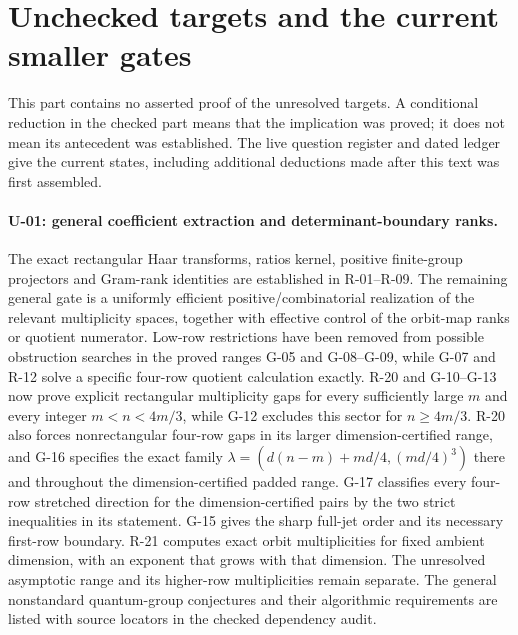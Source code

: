 \section{Unchecked targets and the current smaller gates}

This part contains no asserted proof of the unresolved targets. A conditional reduction in the checked part means that the implication was proved; it does not mean its antecedent was established. The live question register and dated ledger give the current states, including additional deductions made after this text was first assembled.

\paragraph{U-01: general coefficient extraction and determinant-boundary ranks.}
The exact rectangular Haar transforms, ratios kernel, positive finite-group projectors and Gram-rank identities are established in R-01--R-09. The remaining general gate is a uniformly efficient positive/combinatorial realization of the relevant multiplicity spaces, together with effective control of the orbit-map ranks or quotient numerator. Low-row restrictions have been removed from possible obstruction searches in the proved ranges G-05 and G-08--G-09, while G-07 and R-12 solve a specific four-row quotient calculation exactly. R-20 and G-10--G-13 now prove explicit rectangular multiplicity gaps for every sufficiently large $m$ and every integer $m<n<4m/3$, while G-12 excludes this sector for $n\geq4m/3$. R-20 also forces nonrectangular four-row gaps in its larger dimension-certified range, and G-16 specifies the exact family $\lambda=(d(n-m)+md/4,(md/4)^3)$ there and throughout the dimension-certified padded range. G-17 classifies every four-row stretched direction for the dimension-certified pairs by the two strict inequalities in its statement. G-15 gives the sharp full-jet order and its necessary first-row boundary. R-21 computes exact orbit multiplicities for fixed ambient dimension, with an exponent that grows with that dimension. The unresolved asymptotic range and its higher-row multiplicities remain separate. The general nonstandard quantum-group conjectures and their algorithmic requirements are listed with source locators in the checked dependency audit.

